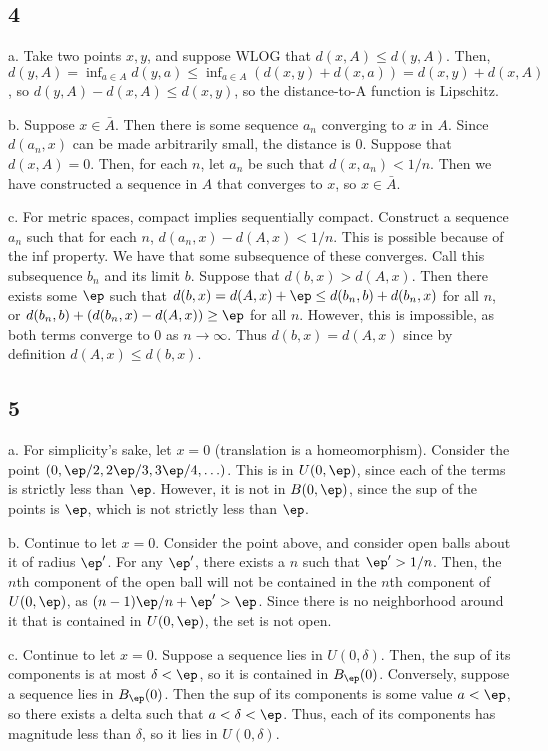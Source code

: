 \documentclass{article}
\begin{document}
\subsection*{4}
a. Take two points $x,y$, and suppose WLOG that $d(x,A)\leq d(y,A)$. Then, $d(y,A)=\inf_{a\in A}d(y,a)\leq\inf_{a\in A}(d(x,y)+d(x,a))=d(x,y)+d(x,A)$, so $d(y,A)-d(x,A)\leq d(x,y)$, so the distance-to-A function is Lipschitz.

b. Suppose $x\in\bar{A}$. Then there is some sequence $a_n$ converging to $x$ in $A$. Since $d(a_n,x)$ can be made arbitrarily small, the distance is $0$. Suppose that $d(x,A)=0$. Then, for each $n$, let $a_n$ be such that $d(x,a_n)<1/n$. Then we have constructed a sequence in $A$ that converges to $x$, so $x\in\bar{A}$.

c. For metric spaces, compact implies sequentially compact. Construct a sequence $a_n$ such that for each $n$, $d(a_n,x)-d(A,x)<1/n$. This is possible because of the inf property. We have that some subsequence of these converges. Call this subsequence $b_n$ and its limit $b$. Suppose that $d(b,x)>d(A,x)$. Then there exists some $\ep$ such that $d(b,x)=d(A,x)+\ep\leq d(b_n,b)+d(b_n,x)$ for all $n$, or $d(b_n,b)+(d(b_n,x)-d(A,x))\geq\ep$ for all $n$. However, this is impossible, as both terms converge to $0$ as $n\to\infty$. Thus $d(b,x)=d(A,x)$ since by definition $d(A,x)\leq d(b,x)$.

\subsection*{5}
a. For simplicity's sake, let $x=0$ (translation is a homeomorphism). Consider the point $(0,\ep/2,2\ep/3,3\ep/4,\ldots)$. This is in $U(0,\ep)$, since each of the terms is strictly less than $\ep$. However, it is not in $B(0,\ep)$, since the sup of the points is $\ep$, which is not strictly less than $\ep$.

b. Continue to let $x=0$. Consider the point above, and consider open balls about it of radius $\ep'$. For any $\ep'$, there exists a $n$ such that $\ep'>1/n$. Then, the $n$th component of the open ball will not be contained in the $n$th component of $U(0,\ep)$, as $(n-1)\ep/n+\ep'>\ep$. Since there is no neighborhood around it that is contained in $U(0,\ep)$, the set is not open.

c. Continue to let $x=0$. Suppose a sequence lies in $U(0,\delta)$. Then, the sup of its components is at most $\delta<\ep$, so it is contained in $B_\ep(0)$. Conversely, suppose a sequence lies in $B_\ep(0)$. Then the sup of its components is some value $a<\ep$, so there exists a delta such that $a<\delta<\ep$. Thus, each of its components has magnitude less than $\delta$, so it lies in $U(0,\delta)$.
\end{document}
